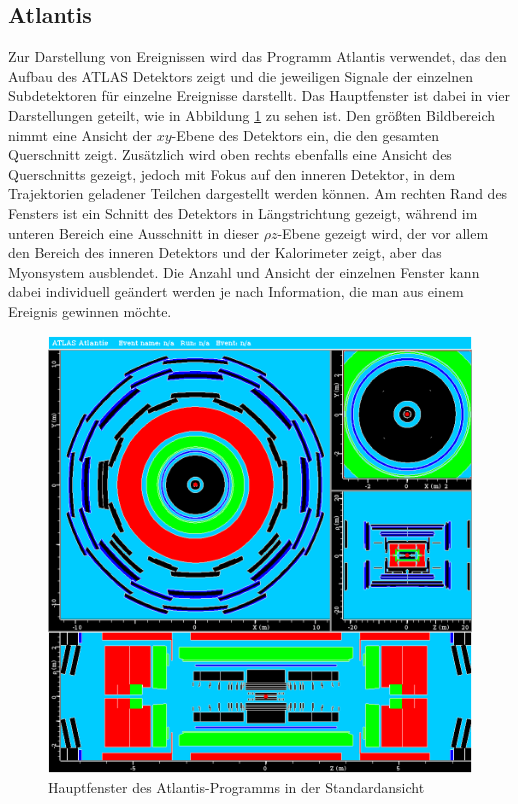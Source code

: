 \documentclass[11pt, a4paper]{article}
\numberwithin{equation}{section}
\begin{document}
\subsection{Atlantis}

Zur Darstellung von Ereignissen wird das Programm Atlantis verwendet, das den Aufbau des ATLAS Detektors zeigt und die jeweiligen Signale der einzelnen Subdetektoren für einzelne Ereignisse darstellt.
Das Hauptfenster ist dabei in vier Darstellungen geteilt, wie in Abbildung \ref{fig:atlantis} zu sehen ist.
Den größten Bildbereich nimmt eine Ansicht der $xy$-Ebene des Detektors ein, die den gesamten Querschnitt zeigt.
Zusätzlich wird oben rechts ebenfalls eine Ansicht des Querschnitts gezeigt, jedoch mit Fokus auf den inneren Detektor, in dem Trajektorien geladener Teilchen dargestellt werden können. Am rechten Rand des Fensters ist ein Schnitt des Detektors in Längstrichtung gezeigt, während im unteren Bereich eine Ausschnitt in dieser $\rho z$-Ebene gezeigt wird, der vor allem den Bereich des inneren Detektors und der Kalorimeter zeigt, aber das Myonsystem ausblendet.
Die Anzahl und Ansicht der einzelnen Fenster kann dabei individuell geändert werden je nach Information, die man aus einem Ereignis gewinnen möchte.
\begin{figure}[htbp]
	\centering
	\includegraphics[width=\textwidth]{./data/atlantis/atlantis_empty.png}
	\caption{Hauptfenster des Atlantis-Programms in der Standardansicht}
	\label{fig:atlantis}
\end{figure}
\end{document}
